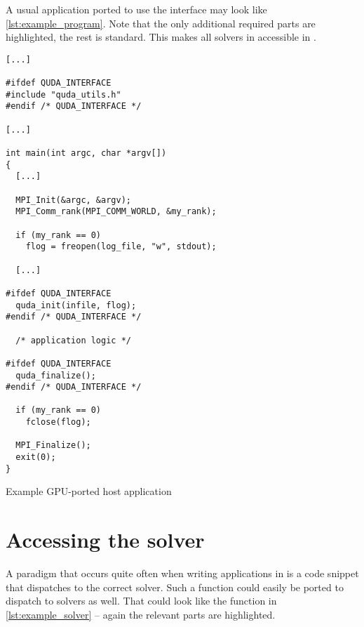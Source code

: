 A usual application ported to use the \quda interface may look like \cref{lst:example_program}. Note that the only additional required parts are highlighted, the rest is standard.
This makes all solvers in \quda accessible in \openqxd.
\begin{codelisting}
\begin{verbatim}
[...]

#ifdef QUDA_INTERFACE
#include "quda_utils.h"
#endif /* QUDA_INTERFACE */

[...]

int main(int argc, char *argv[])
{
  [...]

  MPI_Init(&argc, &argv);
  MPI_Comm_rank(MPI_COMM_WORLD, &my_rank);

  if (my_rank == 0)
    flog = freopen(log_file, "w", stdout);

  [...]

#ifdef QUDA_INTERFACE
  quda_init(infile, flog);
#endif /* QUDA_INTERFACE */

  /* application logic */

#ifdef QUDA_INTERFACE
  quda_finalize();
#endif /* QUDA_INTERFACE */

  if (my_rank == 0)
    fclose(flog);

  MPI_Finalize();
  exit(0);
}
\end{verbatim}
\caption{Example GPU-ported host application}
\label{lst:example_program}
\end{codelisting}


\section{Accessing the solver}
\label{sec:develop:solver}

A paradigm that occurs quite often when writing applications in \openqxd is a code snippet that dispatches to the correct solver.
Such a function could easily be ported to dispatch to \qudas solvers as well.
That could look like the function  in \cref{lst:example_solver} -- again the relevant parts are highlighted.

